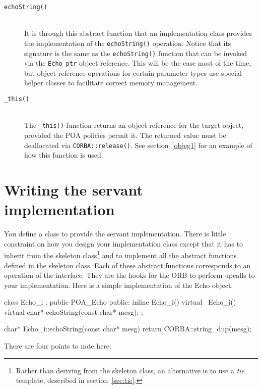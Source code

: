 \documentclass[11pt,oneside,a4paper]{book}
\newcommand{\type}[1]{\texttt{#1}}
\newcommand{\op}[1]{\texttt{#1()}}
\newcommand{\term}[1]{\textit{#1}}
\newcommand{\dsc}{\discretionary{}{}{}}
\begin{document}
\begin{description}

\item[\op{echoString}]\mbox{}\\
%
It is through this abstract function that an implementation class
provides the implementation of the \op{echoString} operation. Notice
that its signature is the same as the \op{echoString} function that
can be invoked via the \type{Echo\_ptr} object reference. This will be
the case most of the time, but object reference operations for certain
parameter types use special helper classes to facilitate correct
memory management.

\item[\op{\_this}]\mbox{}\\
%
The \op{\_this} function returns an object reference for the target
object, provided the POA policies permit it. The returned value must
be deallocated via \op{CORBA::\dsc{}release}.  See
section~\ref{objeg1} for an example of how this function is used.

\end{description}


\section{Writing the servant implementation}
\label{objimpl}

You define a class to provide the servant implementation. There is
little constraint on how you design your implementation class except
that it has to inherit from the skeleton class\footnote{Rather than
  deriving from the skeleton class, an alternative is to use a
  \term{tie} template, described in section~\ref{sec:tie}.} and to
implement all the abstract functions defined in the skeleton
class. Each of these abstract functions corresponds to an operation of
the interface. They are the hooks for the ORB to perform upcalls to
your implementation. Here is a simple implementation of the Echo
object.

\begin{cxxlisting}
class Echo_i : public POA_Echo
{
public:
  inline Echo_i() {}
  virtual ~Echo_i() {}
  virtual char* echoString(const char* mesg);
};

char* Echo_i::echoString(const char* mesg)
{
  return CORBA::string_dup(mesg);
}
\end{cxxlisting}

\noindent There are four points to note here:
\end{document}
